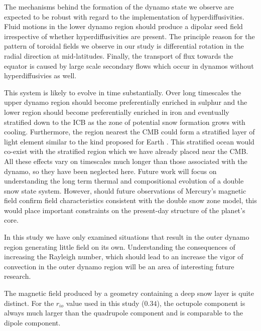 The mechanisms behind the formation of the dynamo state we observe are expected to be robust with regard to the implementation of hyperdiffusivities. Fluid motions in the lower dynamo region should produce a dipolar seed field irrespective of whether hyperdiffusivities are present. The principle reason for the pattern of toroidal fields we observe in our study is differential rotation in the radial direction at mid-latitudes. Finally, the transport of flux towards the equator is caused by large scale secondary flows which occur in dynamos without hyperdiffusivies as well. 

This system is likely to evolve in time substantially. Over long timescales the upper dynamo region should become preferentially enriched in sulphur and the lower region should become preferentially enriched in iron and eventually stratified down to the ICB as the zone of potential snow formation grows with cooling. Furthermore, the region nearest the CMB could form a stratified layer of light element similar to the kind proposed for Earth \citep{Braginsky2006}. This stratified ocean would co-exist with the stratified region which we have already placed near the CMB. All these effects vary on timescales much longer than those associated with the dynamo, so they have been neglected here. Future work will focus on understanding the long term thermal and compositional evolution of a double snow state system. However, should future observations of Mercury's magnetic field confirm field characteristics consistent with the double snow zone model, this would place important constraints on the present-day structure of the planet's core.

In this study we have only examined situations that result in the outer dynamo region generating little field on its own. Understanding the consequences of increasing the Rayleigh number, which should lead to an increase the vigor of convection in the outer dynamo region will be an area of interesting future research.

The magnetic field produced by a geometry containing a deep snow layer is quite distinct. For the $r_{io}$ value used in this study ($0.34$), the octupole component is always much larger than the quadrupole component and is comparable to the dipole component.

















